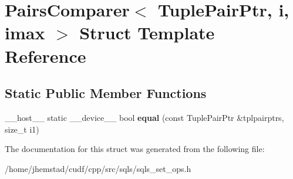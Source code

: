 \hypertarget{structPairsComparer}{}\section{Pairs\+Comparer$<$ Tuple\+Pair\+Ptr, i, imax $>$ Struct Template Reference}
\label{structPairsComparer}
\subsection*{Static Public Member Functions}
\begin{DoxyCompactItemize}
\item 
\+\_\+\+\_\+host\+\_\+\+\_\+ static \+\_\+\+\_\+device\+\_\+\+\_\+ bool {\bfseries equal} (const Tuple\+Pair\+Ptr \&tplpairptrs, size\+\_\+t i1)\hypertarget{structPairsComparer_aa9e2e1749410a47635b6e1b18c297678}{}\label{structPairsComparer_aa9e2e1749410a47635b6e1b18c297678}

\end{DoxyCompactItemize}


The documentation for this struct was generated from the following file\+:\begin{DoxyCompactItemize}
\item 
/home/jhemstad/cudf/cpp/src/sqls/sqls\+\_\+set\+\_\+ops.\+h\end{DoxyCompactItemize}
